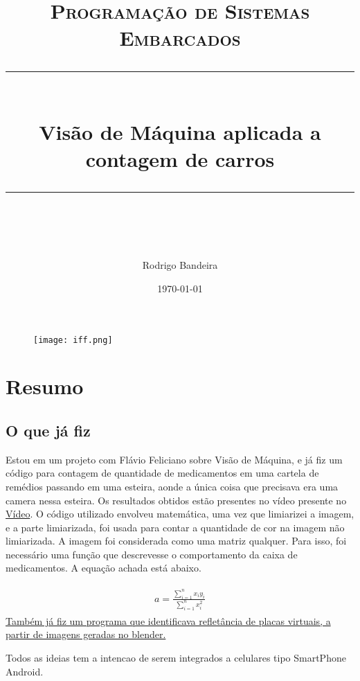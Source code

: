 \documentclass[14pt]{scrartcl} %
\title{	
	\normalfont\normalsize
	\textsc{Programação de Sistemas Embarcados}\\ %
	\vspace{25pt} %
	\rule{\linewidth}{0.5pt}\\ %
	\vspace{20pt} %
	{\huge Visão de Máquina aplicada a contagem de carros}\\ %
	\vspace{12pt} %
	\rule{\linewidth}{2pt}\\ %
	\vspace{12pt} %
}
\author{\LARGE Rodrigo Bandeira} %
\date{\normalsize\today} %
\begin{document}
\maketitle %


\begin{figure}[h] %
	\centering
	\texttt{[image: iff.png]} %
\end{figure}

\newpage

\section{Resumo}

\subsection{O que já fiz}
Estou em um projeto com Flávio Feliciano sobre Visão de Máquina, e já fiz um código para contagem de quantidade de medicamentos em uma cartela de remédios passando em uma esteira, aonde a única coisa que precisava era uma camera nessa esteira. Os resultados obtidos estão presentes no vídeo presente no \href{https://streamable.com/3e0jtt}{Vídeo}.  \newline
O código utilizado envolveu matemática, uma vez que limiarizei a imagem, e a parte limiarizada, foi usada para contar a quantidade de cor na imagem não limiarizada. A imagem foi considerada como uma matriz qualquer. Para isso, foi necessário uma função que descrevesse o comportamento da caixa de medicamentos. A equação achada está abaixo.

\begin{align} 
	\begin{split}
		a=\frac{\sum_{i=1}^{n}x_{i}y_{i}}{\sum_{i=1}^{n}x_{i}^{2}}
	\end{split}					
\end{align}
\href{https://streamable.com/3g9qkd}{Também já fiz um programa que identificava refletância de placas virtuais, a partir de imagens geradas no blender.}
 

\newpage
Todos as ideias tem a intencao de serem integrados a celulares tipo SmartPhone Android.
\end{document}
